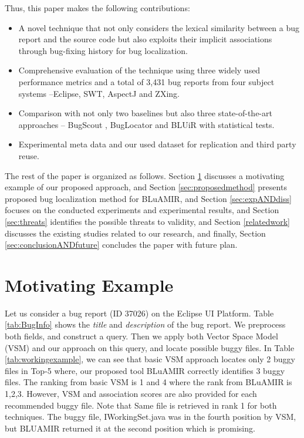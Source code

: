 \documentclass[conference]{IEEEtran}
\begin{document}
Thus, this paper makes the following contributions:
\begin{itemize}
	\item A novel technique that not only considers the lexical similarity between a bug report and the source code but also exploits their implicit associations through bug-fixing history for bug localization.
	\item Comprehensive evaluation of the technique using three widely used performance metrics and a total of 3,431 bug reports from four subject systems --Eclipse, SWT, AspectJ and ZXing.
	\item Comparison with not only two baselines \cite{vector-space-model,MarcusLSI} but also three state-of-the-art approaches -- BugScout \cite{Nguyen}, BugLocator \cite{Jian} and BLUiR \cite{Saha} with statistical tests.
	\item Experimental meta data and our used dataset for  replication and third party reuse.
\end{itemize}

The rest of the paper is organized as follows. Section \ref{sec:motivatingexample} discusses a motivating example of our proposed approach, and Section \ref{sec:proposedmethod} presents proposed bug localization method for BLuAMIR, and Section \ref{sec:expANDdiss} focuses on the conducted experiments and experimental results, and Section \ref{sec:threats} identifies the possible threats to validity, and Section \ref{relatedwork}
discusses the existing studies related to our research, and finally,  
Section \ref{sec:conclusionANDfuture} concludes the paper with future plan.
\section{Motivating Example}\label{sec:motivatingexample}
Let us consider a bug report (ID 37026) on the Eclipse UI Platform. Table \ref{tab:BugInfo} shows the \textit{title} and \textit{description} of the bug report. We preprocess both fields, and construct a query. Then we apply both Vector Space Model (VSM) and our approach on this query, and locate possible buggy files. 
In Table \ref{tab:workingexample}, we can see that basic VSM approach locates only 2 buggy files in Top-5 where, our proposed tool BLuAMIR correctly identifies 3 buggy files. The ranking from basic VSM is 1 and 4 where the rank from BLuAMIR is 1,2,3. However, VSM and association scores are also provided for each recommended buggy file. 
Note that Same file is retrieved in rank 1 for both techniques. 
The buggy file,  
IWorkingSet.java was in the fourth position by VSM, but BLUAMIR returned it at the second position which is promising.
\end{document}
